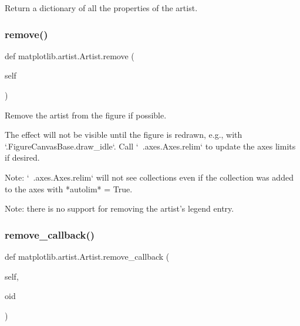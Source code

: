 \begin{DoxyVerb}Return a dictionary of all the properties of the artist.\end{DoxyVerb}
 \mbox{\label{classmatplotlib_1_1artist_1_1Artist_a2db9fb3a04630ec165858e8ffd4f6a0d}} 
\subsubsection{\texorpdfstring{remove()}{remove()}}
{\footnotesize\ttfamily def matplotlib.\+artist.\+Artist.\+remove (\begin{DoxyParamCaption}\item[{}]{self }\end{DoxyParamCaption})}

\begin{DoxyVerb}Remove the artist from the figure if possible.

The effect will not be visible until the figure is redrawn, e.g.,
with `.FigureCanvasBase.draw_idle`.  Call `~.axes.Axes.relim` to
update the axes limits if desired.

Note: `~.axes.Axes.relim` will not see collections even if the
collection was added to the axes with *autolim* = True.

Note: there is no support for removing the artist's legend entry.
\end{DoxyVerb}
 \mbox{\label{classmatplotlib_1_1artist_1_1Artist_a856701800af1bb57d880bf07465db0e7}} 
\subsubsection{\texorpdfstring{remove\+\_\+callback()}{remove\_callback()}}
{\footnotesize\ttfamily def matplotlib.\+artist.\+Artist.\+remove\+\_\+callback (\begin{DoxyParamCaption}\item[{}]{self,  }\item[{}]{oid }\end{DoxyParamCaption})}

